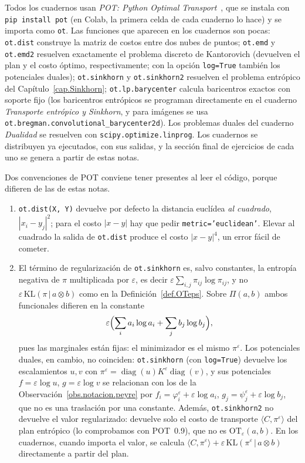 \documentclass[12pt, a4paper]{amsbook}
\newcommand{\ve}{\varepsilon}
\theoremstyle{remark}
\theoremstyle{definition}
\numberwithin{section}{chapter}
\numberwithin{subsection}{section}
\numberwithin{equation}{section}
\numberwithin{figure}{chapter}
\begin{document}
Todos los cuadernos usan \emph{POT: Python Optimal Transport}~\cite{POT},
que se instala con \texttt{pip install pot} (en Colab, la primera celda de
cada cuaderno lo hace) y se importa como \texttt{ot}. Las funciones que
aparecen en los cuadernos son pocas:
\texttt{ot.dist} construye la matriz de costos entre dos nubes de puntos;
\texttt{ot.emd} y \texttt{ot.emd2} resuelven exactamente el problema discreto
de Kantorovich (devuelven el plan y el costo óptimo, respectivamente; con la
opción \texttt{log=True} también los potenciales duales);
\texttt{ot.sinkhorn} y \texttt{ot.sinkhorn2} resuelven el problema entrópico
del Capítulo~\ref{cap.Sinkhorn}; \texttt{ot.lp.barycenter} calcula
baricentros exactos con soporte fijo (los baricentros entrópicos se programan
directamente en el cuaderno \emph{Transporte entrópico y Sinkhorn}, y para
imágenes se usa \texttt{ot.bregman.convolutional\_barycenter2d}). Los
problemas duales del cuaderno \emph{Dualidad} se resuelven con
\texttt{scipy.optimize.linprog}. Los cuadernos se distribuyen ya ejecutados,
con sus salidas, y la sección final de ejercicios de cada uno se genera a
partir de estas notas.

Dos convenciones de POT conviene tener presentes al leer el código, porque
difieren de las de estas notas.

\begin{enumerate}[label=(\roman*)]
\item \texttt{ot.dist(X, Y)} devuelve por defecto la distancia euclídea
\emph{al cuadrado}, $|x_i-y_j|^2$; para el costo $|x-y|$ hay que pedir
\texttt{metric='euclidean'}. Elevar al cuadrado la salida de
\texttt{ot.dist} produce el costo $|x-y|^4$, un error fácil de cometer.
\item El término de regularización de \texttt{ot.sinkhorn} es, salvo
constantes, la entropía negativa de $\pi$ multiplicada por $\ve$, es decir
$\ve\sum_{i,j}\pi_{ij}\log\pi_{ij}$, y no $\ve\,\mathrm{KL}(\pi\,|\,a\otimes b)$ como en la
Definición~\ref{def.OTeps}. Sobre $\Pi(a,b)$ ambos funcionales difieren en la
constante
\[
\ve\Bigl(\sum_ia_i\log a_i+\sum_jb_j\log b_j\Bigr),
\]
pues las marginales están fijas: el minimizador es el mismo $\pi^\ve$. Los
potenciales duales, en cambio, no coinciden: \texttt{ot.sinkhorn} (con
\texttt{log=True}) devuelve los escalamientos $u,v$ con
$\pi^\ve=\operatorname{diag}(u)K^\ve\operatorname{diag}(v)$, y sus
potenciales $f=\ve\log u$, $g=\ve\log v$ se relacionan con los de la
Observación~\ref{obs.notacion.peyre} por $f_i=\varphi^\ve_i+\ve\log a_i$,
$g_j=\psi^\ve_j+\ve\log b_j$, que no es una traslación por una constante.
Además, \texttt{ot.sinkhorn2} no devuelve el valor regularizado: devuelve
solo el costo de transporte $\langle C,\pi^\ve\rangle$ del plan entrópico
(lo comprobamos con POT~0.9), que no es $\mathrm{OT}_\ve(a,b)$. En los
cuadernos, cuando importa el valor, se calcula
$\langle C,\pi^\ve\rangle+\ve\,\mathrm{KL}(\pi^\ve\,|\,a\otimes b)$
directamente a partir del plan.
\end{enumerate}
\end{document}
